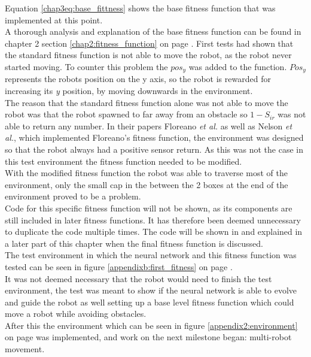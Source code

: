 Equation \ref{chap3eq:base_fittness} shows the base fitness function that was implemented at this point. \\
A thorough analysis and explanation of the base fitness function can be found in chapter 2 section \ref{chap2:fitness_function} on page \pageref{chap2:fitness_function}. 
First tests had shown that the standard fitness function is not able to move the robot, as the robot never started moving. To counter this problem the $pos_y$ was added to the function. $Pos_y$ represents the robots position on the y axis, so the robot is rewarded for increasing its \textit{y} position, by moving downwards in the environment.\\
The reason that the standard fitness function alone was not able to move the robot was that the robot spawned to far away from an obstacle so $1 - S_{ir}$ was not able to return any number. In their papers Floreano \textit{et al.}\cite{499791} as well as Nelson \textit{et al.}\cite{Nelson2009Fitness}, which implemented Floreano's fitness function, the environment was designed so that the robot always had a positive sensor return. As this was not the case in this test environment the fitness function needed to be modified. \\
With the modified fitness function the robot was able to traverse most of the environment, only the small cap in the between the 2 boxes at the end of the environment proved to be a problem.\\

Code for this specific fitness function will not be shown, as its components are still included in later fitness functions. It has therefore been deemed unnecessary to duplicate the code multiple times. 
The code will be shown in and explained in a later part of this chapter when the final fitness function is discussed. \\
The test environment in which the neural network and this fitness function was tested can be seen in figure \ref{appendixb:first_fitness} on page \pageref{appendixb:first_fitness}. \\

It was not deemed necessary that the robot would need to finish the test environment, the test was meant to show if the neural network is able to evolve and guide the robot as well setting up a base level fitness function which could move a robot while avoiding obstacles. \\

After this the environment which can be seen in figure \ref{appendix2:environment} on page \pageref{appendix2:environment} was implemented, and work on the next milestone began: multi-robot movement.\\


